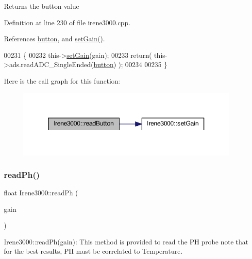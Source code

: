 \begin{DoxyReturn}{Returns}
the button value 
\end{DoxyReturn}


Definition at line \hyperlink{irene3000_8cpp_source_l00230}{230} of file \hyperlink{irene3000_8cpp_source}{irene3000.\+cpp}.



References \hyperlink{_irene3000_8h_source_l00024}{button}, and \hyperlink{irene3000_8cpp_source_l00242}{set\+Gain()}.


\begin{DoxyCode}
00231 \{
00232     this->\hyperlink{class_irene3000_aff7c5da186b388e7272e63ff88a20c34}{setGain}(gain);
00233     \textcolor{keywordflow}{return}( this->ads.readADC\_SingleEnded(\hyperlink{_irene3000_8h_a37976ee6fe1fb8546bfd6153b83ffa6c}{button}) );
00234     
00235 \}
\end{DoxyCode}
Here is the call graph for this function\+:
\nopagebreak
\begin{figure}[H]
\begin{center}
\leavevmode
\includegraphics[width=328pt]{class_irene3000_ae0e0a5b773c3625b44c1d113c76a1540_cgraph}
\end{center}
\end{figure}
\mbox{\label{class_irene3000_abf3db725fabb0634ec889b32068a5eec}} 
\subsubsection{\texorpdfstring{read\+Ph()}{readPh()}}
{\footnotesize\ttfamily float Irene3000\+::read\+Ph (\begin{DoxyParamCaption}\item[{ads\+Gain\+\_\+t}]{gain }\end{DoxyParamCaption})}

Irene3000\+::read\+Ph(gain)\+: This method is provided to read the PH probe note that for the best results, PH must be correlated to Temperature.

